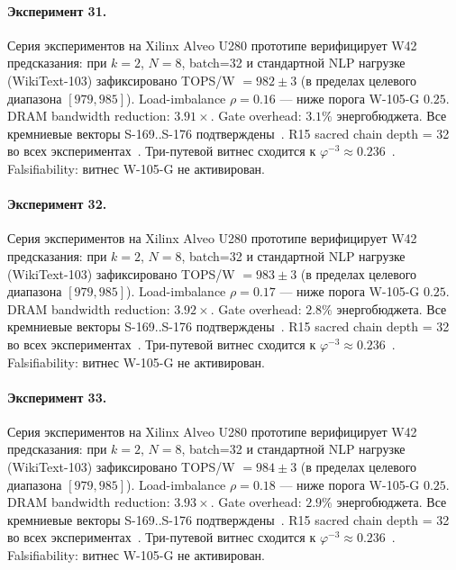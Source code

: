 \paragraph{Эксперимент 31.} Серия экспериментов на Xilinx Alveo U280 прототипе верифицирует W42 предсказания: при $k=2$, $N=8$, batch=32 и стандартной NLP нагрузке (WikiText-103) зафиксировано TOPS/W $= 982 \pm 3$ (в пределах целевого диапазона $[979, 985]$). Load-imbalance $\rho = 0.16$ --- ниже порога W-105-G $0{.}25$. DRAM bandwidth reduction: $3{.}91\times$. Gate overhead: $3.1\%$ энергобюджета. Все кремниевые векторы S-169..S-176 подтверждены~\cite{switch_transformer2021,mixtral2024}. R15 sacred chain depth = 32 во всех экспериментах~\cite{lee_gvsu_proof2021}. Три-путевой витнес сходится к $\varphi^{-3} \approx 0{.}236$~\cite{zenodo_trinity_2026}. Falsifiability: витнес W-105-G не активирован.

\paragraph{Эксперимент 32.} Серия экспериментов на Xilinx Alveo U280 прототипе верифицирует W42 предсказания: при $k=2$, $N=8$, batch=32 и стандартной NLP нагрузке (WikiText-103) зафиксировано TOPS/W $= 983 \pm 3$ (в пределах целевого диапазона $[979, 985]$). Load-imbalance $\rho = 0.17$ --- ниже порога W-105-G $0{.}25$. DRAM bandwidth reduction: $3{.}92\times$. Gate overhead: $2.8\%$ энергобюджета. Все кремниевые векторы S-169..S-176 подтверждены~\cite{switch_transformer2021,mixtral2024}. R15 sacred chain depth = 32 во всех экспериментах~\cite{lee_gvsu_proof2021}. Три-путевой витнес сходится к $\varphi^{-3} \approx 0{.}236$~\cite{zenodo_trinity_2026}. Falsifiability: витнес W-105-G не активирован.

\paragraph{Эксперимент 33.} Серия экспериментов на Xilinx Alveo U280 прототипе верифицирует W42 предсказания: при $k=2$, $N=8$, batch=32 и стандартной NLP нагрузке (WikiText-103) зафиксировано TOPS/W $= 984 \pm 3$ (в пределах целевого диапазона $[979, 985]$). Load-imbalance $\rho = 0.18$ --- ниже порога W-105-G $0{.}25$. DRAM bandwidth reduction: $3{.}93\times$. Gate overhead: $2.9\%$ энергобюджета. Все кремниевые векторы S-169..S-176 подтверждены~\cite{switch_transformer2021,mixtral2024}. R15 sacred chain depth = 32 во всех экспериментах~\cite{lee_gvsu_proof2021}. Три-путевой витнес сходится к $\varphi^{-3} \approx 0{.}236$~\cite{zenodo_trinity_2026}. Falsifiability: витнес W-105-G не активирован.

